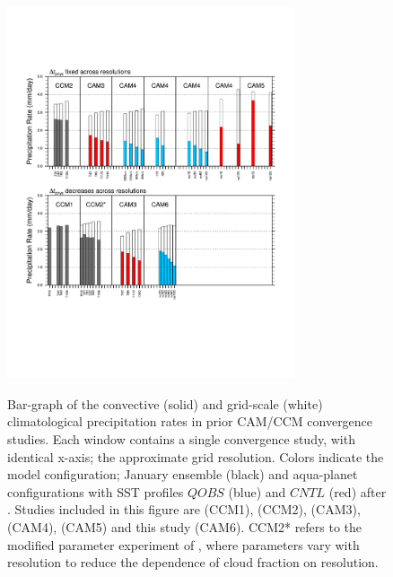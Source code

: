 \documentclass[times]{qjrms4}
\begin{document}
\begin{figure}[t]
\begin{center}
\noindent\includegraphics[width=20pc,angle=0]{figs/cam-history.pdf}\\
\end{center}
\caption{Bar-graph of the convective (solid) and grid-scale (white) climatological precipitation rates in prior CAM/CCM convergence studies. Each window contains a single convergence study, with identical x-axis; the approximate grid resolution. Colors indicate the model configuration; January ensemble (black) and aqua-planet configurations with SST profiles $QOBS$ (blue) and $CNTL$ (red) after \cite{NH2000ASL}. Studies included in this figure are \cite{KW1991JGR} (CCM1), \cite{WETAL1995CD} (CCM2), \cite{W2008TELLUS} (CAM3), \cite{RETAL2013JCLIM,ZetAl2014JCb,HR2017JCLIM} (CAM4), \cite{ZetAl2014JCb} (CAM5) and this study (CAM6). CCM2* refers to the modified parameter experiment of \cite{WETAL1995CD}, where parameters vary with resolution to reduce the dependence of cloud fraction on resolution.}
\label{fig:cam-history}
\end{figure}
\end{document}
